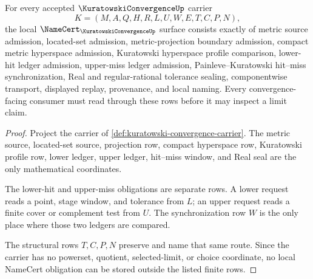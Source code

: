 \begin{theorem}
\label{thm:kuratowski-convergence-namecert-obligations}
For every accepted $\KuratowskiConvergenceUp$ carrier
$$
K=(M,A,Q,H,R,L,U,W,E,T,C,P,N),
$$
the local $\NameCert_{\KuratowskiConvergenceUp}$ surface consists exactly of metric source admission, located-set admission, metric-projection boundary admission, compact metric hyperspace admission, Kuratowski hyperspace profile comparison, lower-hit ledger admission, upper-miss ledger admission, Painleve--Kuratowski hit--miss synchronization, Real and regular-rational tolerance sealing, componentwise transport, displayed replay, provenance, and local naming. Every convergence-facing consumer must read through these rows before it may inspect a limit claim.
\end{theorem}
\begin{proof}
Project the carrier of \autoref{def:kuratowski-convergence-carrier}. The metric source, located-set source, projection row, compact hyperspace row, Kuratowski profile row, lower ledger, upper ledger, hit--miss window, and Real seal are the only mathematical coordinates.

The lower-hit and upper-miss obligations are separate rows. A lower request reads a point, stage window, and tolerance from $L$; an upper request reads a finite cover or complement test from $U$. The synchronization row $W$ is the only place where those two ledgers are compared.

The structural rows $T,C,P,N$ preserve and name that same route. Since the carrier has no powerset, quotient, selected-limit, or choice coordinate, no local NameCert obligation can be stored outside the listed finite rows.
\end{proof}

